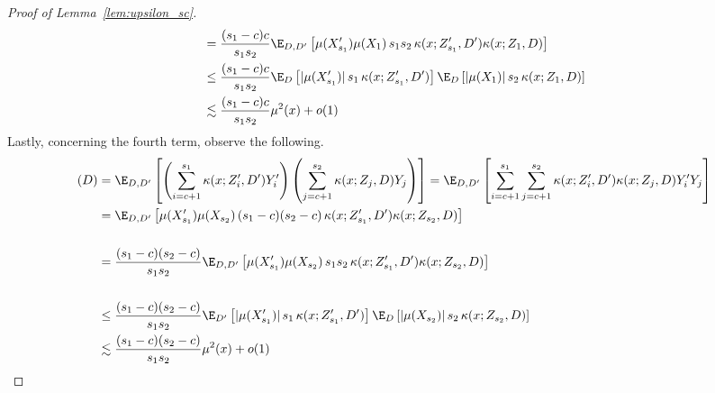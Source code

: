 \begin{proof}[Proof of Lemma~\ref{lem:upsilon_sc}]
\begin{equation}
\begin{aligned}
			 & = \frac{(s_1 - c)c}{s_1 s_2}\E_{D, D^{\prime}}\left[\mu(X_{s_1}^{\prime})\mu(X_1) \, s_1 s_2 \, \kappa(x; Z_{s_1}^{\prime}, D^{\prime})\kappa(x; Z_1, D)\right] \\
			 & \leq \frac{(s_1 - c)c}{s_1 s_2}
			\E_{D}\left[|\mu(X_{s_1}^{\prime})| \, s_1 \, \kappa(x; Z_{s_1}^{\prime}, D^{\prime})\right]
			\E_{D}\left[|\mu(X_1)| \, s_2 \, \kappa(x; Z_1, D)\right]                                                                                                                             \\
			 & \lesssim \frac{(s_1 - c)c}{s_1 s_2} \mu^2(x) + o(1)
		\end{aligned}
	\end{equation}
	Lastly, concerning the fourth term, observe the following.
	\begin{equation}
		\begin{aligned}
			(D)
			 & = \E_{D, D^{\prime}}\left[\left(\sum_{i = c+1}^{s_1}\kappa(x; Z_{i}^{\prime}, D^{\prime}) Y_{i}^{\prime}\right)
				\left(\sum_{j = c+1}^{s_2} \kappa(x; Z_j, D) Y_j\right)\right]
			= \E_{D, D^{\prime}}\left[\sum_{i = c+1}^{s_1}\sum_{j = c+1}^{s_2}\kappa(x; Z_{i}^{\prime}, D^{\prime}) \kappa(x; Z_j, D)  Y_{i}^{\prime}Y_j\right]                                                        \\
			 & = \E_{D, D^{\prime}}\left[\mu(X_{s_1}^{\prime}) \mu(X_{s_2}) \, (s_1 - c)(s_2 -c) \,\kappa(x; Z_{s_1}^{\prime}, D^{\prime}) \kappa(x; Z_{s_2}, D)  \right]                        \\                                                                                                                                                                       \\
			 & = \frac{(s_1 - c)(s_2 -c)}{s_1 s_2}\E_{D, D^{\prime}}\left[\mu(X_{s_1}^{\prime}) \mu(X_{s_2}) \, s_1 s_2 \,\kappa(x; Z_{s_1}^{\prime}, D^{\prime}) \kappa(x; Z_{s_2}, D)  \right] \\                                                                                                                                                                       \\
			 & \leq \frac{(s_1 - c)(s_2 -c)}{s_1 s_2}
			\E_{D^{\prime}}\left[|\mu(X_{s_1}^{\prime})| \, s_1 \,\kappa(x; Z_{s_1}^{\prime}, D^{\prime})   \right]
			\E_{D}\left[ |\mu(X_{s_2})| \, s_2 \, \kappa(x; Z_{s_2}, D)  \right]                                                                                                                                    \\
			 & \lesssim \frac{(s_1 - c)(s_2 -c)}{s_1 s_2}\mu^2(x) + o(1)
		\end{aligned}
	\end{equation}
\end{proof}

